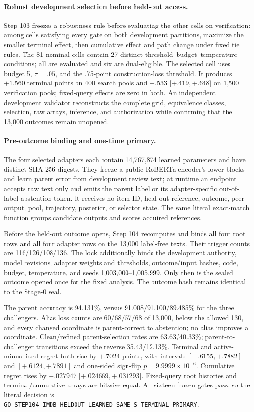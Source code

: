 \paragraph{Robust development selection before held-out access.}
Step 103 freezes a robustness rule before evaluating the other cells on verification: among cells satisfying every gate on both development partitions, maximize the smaller terminal effect, then cumulative effect and path change under fixed tie rules. The 81 nominal cells contain 27 distinct threshold--budget--temperature conditions; all are evaluated and six are dual-eligible. The selected cell uses budget 5, $\tau=.05$, and the .75-point construction-loss threshold. It produces $+1.560$ terminal points on 400 search pools and $+.533$ [$+.419,+.648$] on 1,500 verification pools; fixed-query effects are zero in both. An independent development validator reconstructs the complete grid, equivalence classes, selection, raw arrays, inference, and authorization while confirming that the 13,000 outcomes remain unopened.

\paragraph{Pre-outcome binding and one-time primary.}
The four selected adapters each contain 14,767,874 learned parameters and have distinct SHA-256 digests. They freeze a public RoBERTa encoder's lower blocks and learn parent error from development review text; at runtime an endpoint accepts raw text only and emits the parent label or its adapter-specific out-of-label abstention token. It receives no item ID, held-out reference, outcome, peer output, pool, trajectory, posterior, or selector state. The same literal exact-match function groups candidate outputs and scores acquired references.

Before the held-out outcome opens, Step 104 recomputes and binds all four root rows and all four adapter rows on the 13,000 label-free texts. Their trigger counts are 116/126/108/136. The lock additionally binds the development authority, model revisions, adapter weights and thresholds, outcome/input hashes, code, budget, temperature, and seeds 1,003,000--1,005,999. Only then is the sealed outcome opened once for the fixed analysis. The outcome hash remains identical to the Stage-0 seal.



The parent accuracy is 94.131\%, versus 91.008/91.100/89.485\% for the three challengers. Alias loss counts are 60/68/57/68 of 13,000, below the allowed 130, and every changed coordinate is parent-correct to abstention; no alias improves a coordinate. Clean/refined parent-selection rates are 63.63/40.33\%; parent-to-challenger transitions exceed the reverse 35.43/12.13\%. Terminal and active-minus-fixed regret both rise by $+.7024$ points, with intervals $[+.6155,+.7882]$ and $[+.6124,+.7891]$ and one-sided sign-flip $p=9.9999\times10^{-6}$. Cumulative regret rises by $+.027947$ [$+.024669,+.031293$]. Fixed-query root histories and terminal/cumulative arrays are bitwise equal. All sixteen frozen gates pass, so the literal decision is \texttt{GO\_STEP104\_IMDB\_HELDOUT\_LEARNED\_SAME\_S\_TERMINAL\_PRIMARY}.

